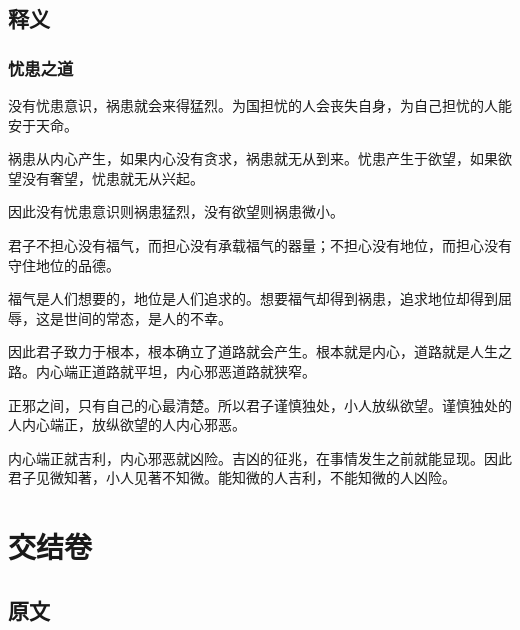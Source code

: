 \documentclass[12pt,UTF8]{ctexbook}
\begin{document}
\chapter{释义}

\section{忧患之道}

没有忧患意识，祸患就会来得猛烈。为国担忧的人会丧失自身，为自己担忧的人能安于天命。

祸患从内心产生，如果内心没有贪求，祸患就无从到来。忧患产生于欲望，如果欲望没有奢望，忧患就无从兴起。

因此没有忧患意识则祸患猛烈，没有欲望则祸患微小。

君子不担心没有福气，而担心没有承载福气的器量；不担心没有地位，而担心没有守住地位的品德。

福气是人们想要的，地位是人们追求的。想要福气却得到祸患，追求地位却得到屈辱，这是世间的常态，是人的不幸。

因此君子致力于根本，根本确立了道路就会产生。根本就是内心，道路就是人生之路。内心端正道路就平坦，内心邪恶道路就狭窄。

正邪之间，只有自己的心最清楚。所以君子谨慎独处，小人放纵欲望。谨慎独处的人内心端正，放纵欲望的人内心邪恶。

内心端正就吉利，内心邪恶就凶险。吉凶的征兆，在事情发生之前就能显现。因此君子见微知著，小人见著不知微。能知微的人吉利，不能知微的人凶险。

\part{交结卷}

\chapter{原文}
\end{document}
